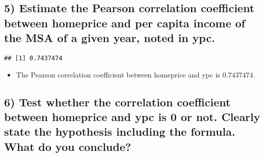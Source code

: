 \documentclass[
  12pt,
]{article}
\newenvironment{Shaded}{\begin{snugshade}}{\end{snugshade}}
\newcommand{\AttributeTok}[1]{\textcolor[rgb]{0.77,0.63,0.00}{#1}}
\newcommand{\FunctionTok}[1]{\textcolor[rgb]{0.00,0.00,0.00}{#1}}
\newcommand{\NormalTok}[1]{#1}
\newcommand{\SpecialCharTok}[1]{\textcolor[rgb]{0.00,0.00,0.00}{#1}}
\newcommand{\StringTok}[1]{\textcolor[rgb]{0.31,0.60,0.02}{#1}}
\providecommand{\tightlist}{%
  \setlength{\itemsep}{0pt}\setlength{\parskip}{0pt}}
\begin{document}
\hypertarget{estimate-the-pearson-correlation-coefficient-between-homeprice-and-per-capita-income-of-the-msa-of-a-given-year-noted-in-ypc.}{%
\subsection{5) Estimate the Pearson correlation coefficient between
homeprice and per capita income of the MSA of a given year, noted in
ypc.}\label{estimate-the-pearson-correlation-coefficient-between-homeprice-and-per-capita-income-of-the-msa-of-a-given-year-noted-in-ypc.}}

\begin{Shaded}
\end{Shaded}

\begin{verbatim}
## [1] 0.7437474
\end{verbatim}

\begin{itemize}
\tightlist
\item
  The Pearson correlation coefficient between homeprice and ypc is
  \(0.7437474\).
\end{itemize}

\hypertarget{test-whether-the-correlation-coefficient-between-homeprice-and-ypc-is-0-or-not.-clearly-state-the-hypothesis-including-the-formula.-what-do-you-conclude}{%
\subsection{6) Test whether the correlation coefficient between
homeprice and ypc is 0 or not. Clearly state the hypothesis including
the formula. What do you
conclude?}\label{test-whether-the-correlation-coefficient-between-homeprice-and-ypc-is-0-or-not.-clearly-state-the-hypothesis-including-the-formula.-what-do-you-conclude}}

\begin{Shaded}
\end{Shaded}
\end{document}
